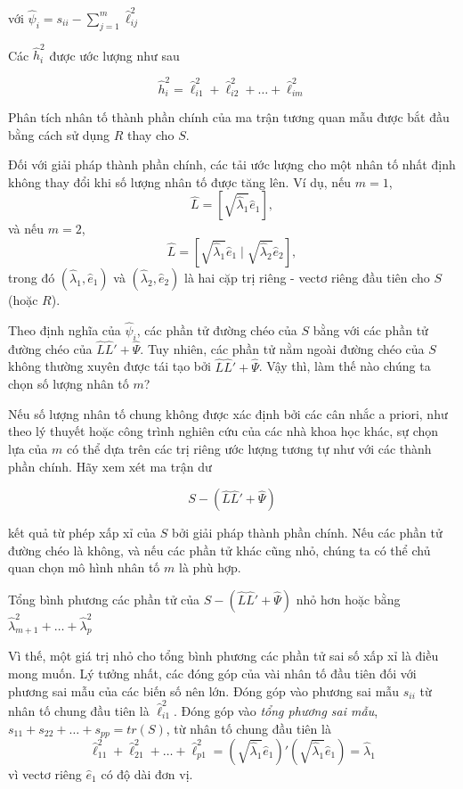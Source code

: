 \documentclass{article}
\begin{document}
với \( \hat{\psi}_i = s_{ii} - \sum_{j=1}^{m} \hat{\ell}_{ij}^2 \)

Các \(\hat{h}_i^2\) được ước lượng như sau

\[
\hat{h}_i^2 = \hat{\ell}_{i1}^2 + \hat{\ell}_{i2}^2 + \ldots + \hat{\ell}_{im}^2
\]

Phân tích nhân tố thành phần chính của ma trận tương quan mẫu được bắt đầu bằng cách sử dụng \( R \) thay cho \( S \).

Đối với giải pháp thành phần chính, các tải ước lượng cho một nhân tố nhất định không thay đổi khi số lượng nhân tố được tăng lên. Ví dụ, nếu \( m = 1 \), 
\[
\hat{L} = \left[ \sqrt{\hat{\lambda}_1} \hat{e}_1 \right],
\]
và nếu \( m = 2 \), 
\[
\hat{L} = \left[ \sqrt{\hat{\lambda}_1} \hat{e}_1 \mid \sqrt{\hat{\lambda}_2} \hat{e}_2 \right],
\]
trong đó \( (\hat{\lambda}_1, \hat{e}_1) \) và \( (\hat{\lambda}_2, \hat{e}_2) \) là hai cặp trị riêng - vectơ riêng đầu tiên cho \( S \) (hoặc \( R \)).

Theo định nghĩa của \( \hat{\psi}_i \), các phần tử đường chéo của \( S \) bằng với các phần tử đường chéo của \( \hat{L}\hat{L}' + \hat{\Psi} \). Tuy nhiên, các phần tử nằm ngoài đường chéo của \( S \) không thường xuyên được tái tạo bởi \( \hat{L}\hat{L}' + \hat{\Psi} \). Vậy thì, làm thế nào chúng ta chọn số lượng nhân tố \( m \)?

Nếu số lượng nhân tố chung không được xác định bởi các cân nhắc a priori, như theo lý thuyết hoặc công trình nghiên cứu của các nhà khoa học khác, sự chọn lựa của \( m \) có thể dựa trên các trị riêng ước lượng tương tự như với các thành phần chính. Hãy xem xét ma trận dư

\[
S - (\hat{L}\hat{L}' + \hat{\Psi})
\]

kết quả từ phép xấp xỉ của \( S \) bởi giải pháp thành phần chính. Nếu các phần tử đường chéo là không, và nếu các phần tử khác cũng nhỏ, chúng ta có thể chủ quan chọn mô hình nhân tố \( m \) là phù hợp.

Tổng bình phương các phần tử của \( S - (\hat{L}\hat{L}' + \hat{\Psi}) \) nhỏ hơn hoặc bằng \( \hat{\lambda}_{m+1}^2 + \ldots + \hat{\lambda}_p^2 \)


Vì thế, một giá trị nhỏ cho tổng bình phương các phần tử sai số xấp xỉ là điều mong muốn. Lý tưởng nhất, các đóng góp của vài nhân tố đầu tiên đối với phương sai mẫu của các biến số nên lớn. Đóng góp vào phương sai mẫu \( s_{ii} \) từ nhân tố chung đầu tiên là \( \hat{\ell}_{i1}^2 \). Đóng góp vào \textit{tổng phương sai mẫu}, \( s_{11} + s_{22} + \ldots + s_{pp} = tr(S) \), từ nhân tố chung đầu tiên là
\[
\hat{\ell}_{11}^2 + \hat{\ell}_{21}^2 + \ldots + \hat{\ell}_{p1}^2 = (\sqrt{\hat{\lambda}_1} \hat{e}_1)'(\sqrt{\hat{\lambda}_1} \hat{e}_1) = \hat{\lambda}_1
\]
vì vectơ riêng \( \hat{e}_1 \) có độ dài đơn vị. 
\end{document}

